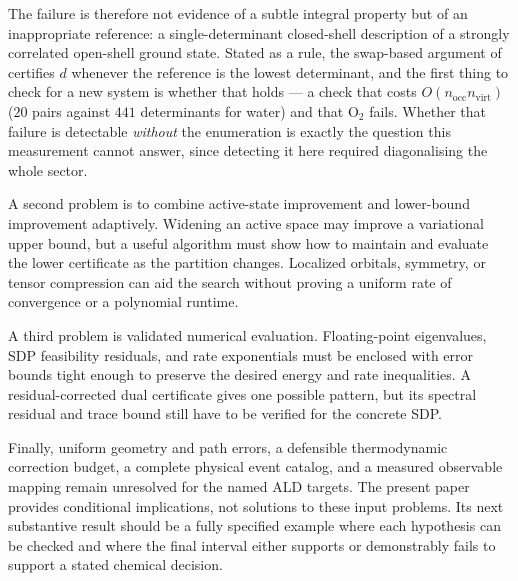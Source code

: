 The failure is therefore not evidence of a subtle integral property but of an
inappropriate reference: a single-determinant closed-shell description of a
strongly correlated open-shell ground state. Stated as a rule, the swap-based
argument of  certifies $d$ whenever the reference is the
lowest determinant, and the first thing to check for a new system is whether that
holds --- a check that costs $O(n_{\mathrm{occ}}n_{\mathrm{virt}})$
($20$ pairs against $441$ determinants for water) and that O$_2$ fails. Whether
that failure is detectable \emph{without} the enumeration is exactly the question
this measurement cannot answer, since detecting it here required diagonalising the
whole sector.

A second problem is to combine active-state improvement and lower-bound
improvement adaptively. Widening an active space may improve a variational
upper bound, but a useful algorithm must show how to maintain and evaluate
the lower certificate as the partition changes. Localized orbitals, symmetry,
or tensor compression can aid the search without proving a uniform rate of
convergence or a polynomial runtime.

A third problem is validated numerical evaluation. Floating-point eigenvalues,
SDP feasibility residuals, and rate exponentials must be enclosed with error
bounds tight enough to preserve the desired energy and rate inequalities.
A residual-corrected dual certificate gives one possible
pattern, but its spectral residual and trace bound still have to be verified
for the concrete SDP.

Finally, uniform geometry and path errors, a defensible thermodynamic
correction budget, a complete physical event catalog, and a measured
observable mapping remain unresolved for the named ALD targets. The present
paper provides conditional implications, not solutions to these input
problems. Its next substantive result should be a fully specified example
where each hypothesis can be checked and where the final interval either
supports or demonstrably fails to support a stated chemical decision.
